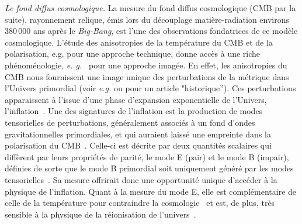 \emph{Le fond diffus cosmologique.} La mesure du fond diffus
cosmologique (CMB par la suite), rayonnement relique, émis lors du
découplage matière-radiation environs 380\,000
ans après le \emph{Big-Bang}, est l'une des observations fondatrices
de ce modèle cosmologique. L'étude des anisotropies de la température
du CMB et de la polarisation, e.g. \citet{MaBertschinger1995} pour
une approche technique, donne accès à une riche phénoménologie,
\emph{e. g.}~\citet{HuNature} pour une approche imagée. En effet, les
anisotropies du CMB nous fournissent une image unique des
perturbations de la métrique dans
l'Univers primordial (voir \emph{e.g.} \citet{Peebles1970}
ou \citet{Zeldovich1970} pour un article "historique'').
Ces perturbations apparaissent à l'issue d'une phase d'expansion
exponentielle de l'Univers, l'inflation~\citep{Guth1981}. Une des
signatures de l'inflation est la production de modes tensorielles de
perturbations, généralement associés à un fond d'ondes gravitationnelles
primordiales, et qui auraient laissé une empreinte dans la
polarisation du CMB~. Celle-ci est décrite par deux
quantités scalaires qui diffèrent par leurs propriétés de parité, le
mode E (pair) et le mode B (impair), définies de sorte que le mode B
primordial soit uniquement généré par les modes
tensorielles~. Sa mesure offrirait donc une
opportunité unique d'accéder à la physique de l'inflation. Quant à la
mesure du mode E, elle est complémentaire de celle de la température
pour contraindre la cosmologie~ et est, de plus, très sensible
à la physique de la réionisation de l'univers~.\\

